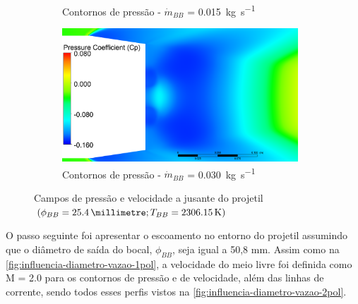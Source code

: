 \begin{figure}
\begin{subfigure}[b]{0.47\textwidth}
        \caption{Contornos de pressão - \(\Dot{m}_{BB}\) = \qty{0,015}{\kilogram\per\second}}
        \label{fig:contorno-pressao-base-bb-1pol-vazao0015}
    \end{subfigure}
    \hfill
    \begin{subfigure}[b]{0.47\textwidth} %
        \centering
        \includegraphics[height=5cm,width=\textwidth]{coeficientepressao-vazao0030-temp2306-diam1pol.png}
        \caption{Contornos de pressão - \(\Dot{m}_{BB}\) = \qty{0,030}{\kilogram\per\second}}
        \label{fig:contorno-pressao-base-bb-1pol-vazao0030}
    \end{subfigure}
	\caption{Campos de pressão e velocidade a jusante do projetil \(\left(\phi_{BB} = \qty{25,4}{\millimetre}; T_{BB} = \qty{2306,15}{\kelvin}\right)\)}
	\label{fig:influencia-base-diametro-vazao-1pol}
\end{figure}

O passo seguinte foi apresentar o escoamento no entorno do projetil assumindo que o diâmetro de saída do bocal, \(\phi_{BB}\), seja igual a 50,8 mm. Assim como na \autoref{fig:influencia-diametro-vazao-1pol}, a velocidade do meio livre foi definida como M = \num{2,0} para os contornos de pressão e de velocidade, além das linhas de corrente, sendo todos esses perfis vistos na \autoref{fig:influencia-diametro-vazao-2pol}.

